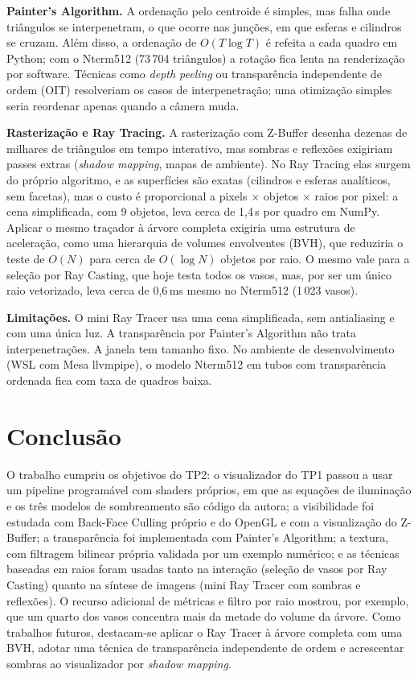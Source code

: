 \documentclass[11pt, a4paper]{article}
\begin{document}
\textbf{Painter's Algorithm.} A ordenação pelo centroide é simples, mas falha onde triângulos se interpenetram, o que ocorre nas junções, em que esferas e cilindros se cruzam. Além disso, a ordenação de $O(T \log T)$ é refeita a cada quadro em Python; com o Nterm512 (73\,704 triângulos) a rotação fica lenta na renderização por software. Técnicas como \emph{depth peeling} ou transparência independente de ordem (OIT) resolveriam os casos de interpenetração; uma otimização simples seria reordenar apenas quando a câmera muda.

\textbf{Rasterização e Ray Tracing.} A rasterização com Z-Buffer desenha dezenas de milhares de triângulos em tempo interativo, mas sombras e reflexões exigiriam passes extras (\emph{shadow mapping}, mapas de ambiente). No Ray Tracing elas surgem do próprio algoritmo, e as superfícies são exatas (cilindros e esferas analíticos, sem facetas), mas o custo é proporcional a pixels $\times$ objetos $\times$ raios por pixel: a cena simplificada, com 9 objetos, leva cerca de 1,4\,s por quadro em NumPy. Aplicar o mesmo traçador à árvore completa exigiria uma estrutura de aceleração, como uma hierarquia de volumes envolventes (BVH), que reduziria o teste de $O(N)$ para cerca de $O(\log N)$ objetos por raio. O mesmo vale para a seleção por Ray Casting, que hoje testa todos os vasos, mas, por ser um único raio vetorizado, leva cerca de 0,6\,ms mesmo no Nterm512 (1\,023 vasos).

\textbf{Limitações.} O mini Ray Tracer usa uma cena simplificada, sem antialiasing e com uma única luz. A transparência por Painter's Algorithm não trata interpenetrações. A janela tem tamanho fixo. No ambiente de desenvolvimento (WSL com Mesa llvmpipe), o modelo Nterm512 em tubos com transparência ordenada fica com taxa de quadros baixa.

\section{Conclusão}

O trabalho cumpriu os objetivos do TP2: o visualizador do TP1 passou a usar um pipeline programável com shaders próprios, em que as equações de iluminação e os três modelos de sombreamento são código da autora; a visibilidade foi estudada com Back-Face Culling próprio e do OpenGL e com a visualização do Z-Buffer; a transparência foi implementada com Painter's Algorithm; a textura, com filtragem bilinear própria validada por um exemplo numérico; e as técnicas baseadas em raios foram usadas tanto na interação (seleção de vasos por Ray Casting) quanto na síntese de imagens (mini Ray Tracer com sombras e reflexões). O recurso adicional de métricas e filtro por raio mostrou, por exemplo, que um quarto dos vasos concentra mais da metade do volume da árvore. Como trabalhos futuros, destacam-se aplicar o Ray Tracer à árvore completa com uma BVH, adotar uma técnica de transparência independente de ordem e acrescentar sombras ao visualizador por \emph{shadow mapping}.
\end{document}
